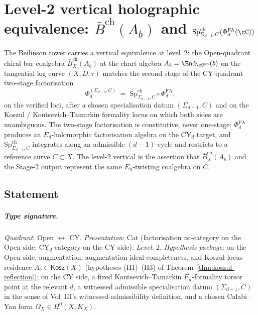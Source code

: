 
\providecommand{\SpCh}{\mathrm{Sp}^{\mathrm{ch}}}
\providecommand{\PhiFA}{\Phi^{\mathrm{FA}}}
\providecommand{\EdHolFA}{E_{d}\text{-}\mathrm{HolFA}}
\providecommand{\EnHolFA}{E_{n}\text{-}\mathrm{HolFA}}
\providecommand{\Bbarch}{\bar{B}^{\mathrm{ch}}}
\providecommand{\Kosz}{\mathsf{Kosz}}
\providecommand{\CY}{\mathrm{CY}}
\providecommand{\HH}{\operatorname{HH}}

\chapter{Level-2 vertical holographic equivalence: $\bar B^{\mathrm{ch}}(A_b)$ and $\SpCh_{\Sigma_{d-1},C}(\PhiFA_d(\cC))$}
\label{app:vertical-equivalence-level-2}

The Beilinson tower carries a vertical equivalence at level~$2$:
the Open-quadrant chiral bar coalgebra $\Bbarch_X(A_b)$ at the chart
algebra $A_b=\End_{\cC^{\mathrm{op}}}(b)$ on the tangential log curve
$(X,D,\tau)$ matches the second stage of the CY-quadrant two-stage
factorisation
\[
 \Phi_d^{(\Sigma_{d-1},C)}\;=\;\SpCh_{\Sigma_{d-1},C}\circ\PhiFA_d ,
\]
on the verified loci, after a chosen specialisation datum
$(\Sigma_{d-1},C)$ and on the Koszul / Kontsevich--Tamarkin formality
locus on which both sides are unambiguous. The two-stage factorisation
is constitutive, never one-stage: $\PhiFA_d$ produces an $E_d$-holomorphic
factorisation algebra on the CY$_d$ target, and $\SpCh_{\Sigma_{d-1},C}$
integrates along an admissible $(d{-}1)$-cycle and restricts to a
reference curve $C\subset X$. The level-$2$ vertical is the assertion
that $\Bbarch_X(A_b)$ and the Stage-$2$ output represent the same
$E_n$-twisting coalgebra on $C$.

\section{Statement}
\label{sec:vert-level-2-statement}

\paragraph{Type signature.}
\textit{Quadrant}: Open $\leftrightarrow$ CY.
\textit{Presentation}: $\mathrm{Cat}$ (factorisation $\infty$-category
on the Open side; CY$_d$-category on the CY side).
\textit{Level}: $2$.
\textit{Hypothesis package}: on the Open side, augmentation,
augmentation-ideal completeness, and Koszul-locus residence
$A_b\in\Kosz(X)$ (hypotheses (H1)--(H3) of
Theorem~\ref{thm:koszul-reflection}); on the CY side, a fixed
Kontsevich--Tamarkin $E_d$-formality torsor point at the relevant $d$,
a witnessed admissible specialisation datum
$(\Sigma_{d-1},C)$ in the sense of Vol~III's
witnessed-admissibility definition, and a chosen Calabi--Yau form
$\Omega_X\in H^0(X,K_X)$.

